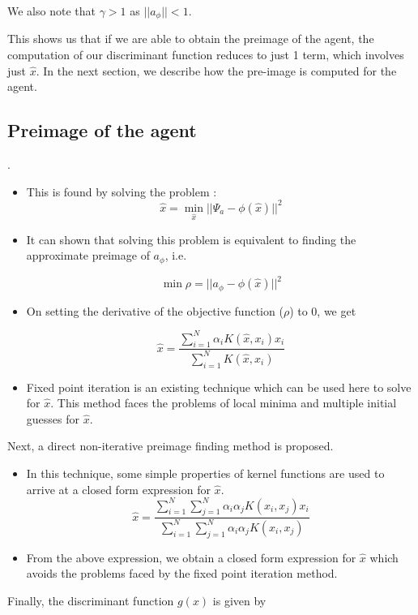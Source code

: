 \documentclass{article} %
\begin{document}
We also note that $\gamma >1$ as $||a_\phi|| < 1$.

This shows us that if we are able to obtain the preimage of the agent, the computation of our discriminant function reduces to just 1 term, which involves just $\hat{x}$. In the next section, we describe how the pre-image is computed for the agent.



\subsection*{Preimage of the agent}. 
\begin{itemize}

\item This is found by solving the problem :
\[ \hat{x} = \min_{\hat{x}} ||\Psi_a - \phi(\hat{x}) ||^2   \]

\item It can shown that solving this problem is equivalent to finding the approximate preimage of $a_\phi$, i.e.

\[ \min \rho = ||a_\phi - \phi(\hat{x}) ||^2 \]

\item On setting the derivative of the objective function ($\rho$) to 0, we get 

\[ \hat{x} = \frac{\sum\limits_{i=1}^N \alpha_i K(\hat{x},x_i)x_i}{\sum\limits_{i=1}^N K(\hat{x},x_i)} \]

\item Fixed point iteration is an existing technique which can be used here to solve for $\hat{x}$. This method faces the problems of local minima and multiple initial guesses for $\hat{x}$.
\end{itemize}

Next, a direct non-iterative preimage finding method is proposed.
\begin{itemize}
\item In this technique, some simple properties of kernel functions are used to arrive at a closed form expression for $\hat{x}$.
\[ \hat{x} = \frac{\sum\limits_{i=1}^N \sum\limits_{j=1}^N \alpha_i \alpha_j K(x_i,x_j) x_i}{\sum\limits_{i=1}^N \sum\limits_{j=1}^N \alpha_i \alpha_j K(x_i,x_j)} \]
\item From the above expression, we obtain a closed form expression for $\hat{x}$ which avoids the problems faced by the fixed point iteration method.
\end{itemize}

Finally, the discriminant function $g(x)$ is given by 
\end{document}

